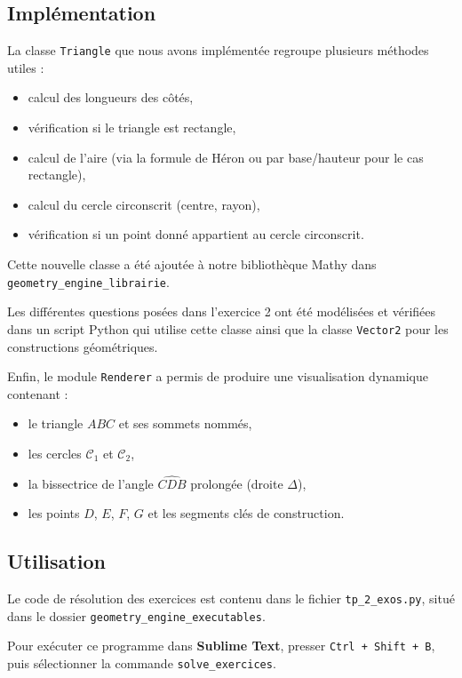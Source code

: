 \documentclass[a4paper,12pt]{article}
\begin{document}
\subsection*{Implémentation}

La classe \texttt{Triangle} que nous avons implémentée regroupe plusieurs méthodes utiles :
\begin{itemize}
    \item calcul des longueurs des côtés,
    \item vérification si le triangle est rectangle,
    \item calcul de l'aire (via la formule de Héron ou par base/hauteur pour le cas rectangle),
    \item calcul du cercle circonscrit (centre, rayon),
    \item vérification si un point donné appartient au cercle circonscrit.
\end{itemize}

Cette nouvelle classe a été ajoutée à notre bibliothèque Mathy dans \texttt{geometry\_engine\_librairie}.

Les différentes questions posées dans l'exercice 2 ont été modélisées et vérifiées dans un script Python qui utilise cette classe ainsi que la classe \texttt{Vector2} pour les constructions géométriques.

Enfin, le module \texttt{Renderer} a permis de produire une visualisation dynamique contenant :
\begin{itemize}
    \item le triangle $ABC$ et ses sommets nommés,
    \item les cercles $\mathcal{C}_1$ et $\mathcal{C}_2$,
    \item la bissectrice de l’angle $\widehat{CDB}$ prolongée (droite $\Delta$),
    \item les points $D$, $E$, $F$, $G$ et les segments clés de construction.
\end{itemize}

\subsection*{Utilisation}

Le code de résolution des exercices est contenu dans le fichier \texttt{tp\_2\_exos.py}, situé dans le dossier \texttt{geometry\_engine\_executables}.

Pour exécuter ce programme dans \textbf{Sublime Text}, presser \texttt{Ctrl + Shift + B}, puis sélectionner la commande \texttt{solve\_exercices}.
\end{document}
